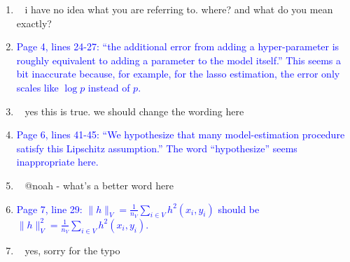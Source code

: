 \documentclass[]{article}
\newcommand{\point}[1]{\item \textcolor{blue}{#1}}
\newcommand{\reply}{\item[]\ }
\begin{document}
\begin{enumerate}
		\reply{
			i have no idea what you are referring to. where? and what do you mean exactly?
		}
	
		\point{
			Page 4, lines 24-27: “the additional error from adding a hyper-parameter is roughly equivalent to adding a parameter to the model itself.” This seems a bit inaccurate because, for example, for the lasso estimation, the error only scales like $\log p$ instead of $p$.
		}
	
		\reply {
			yes this is true. we should change the wording here
		}
	
		\point{
		Page 6, lines 41-45: “We hypothesize that many model-estimation procedure satisfy this Lipschitz assumption.” The word “hypothesize” seems inappropriate here.
		}
	
		\reply{
			@noah - what's a better word here
		}
	
		\point{
			Page 7, line 29: $\|h\|_V = \frac{1}{n_V} \sum_{i \in V} h^2(x_i, y_i)$ should be $\|h\|_V^2 = \frac{1}{n_V} \sum_{i \in V} h^2(x_i, y_i).$
		}
	
		\reply{
			yes, sorry for the typo
		}
	
		\end{enumerate} 
	
\end{document}
